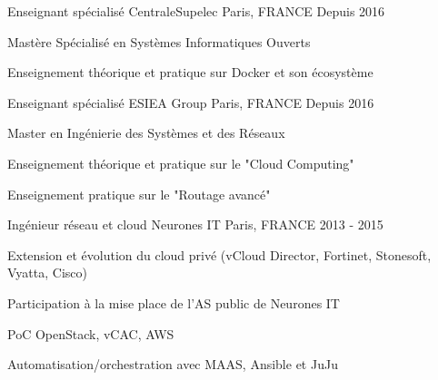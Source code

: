 \begin{cventries}
  \cventry
    {Enseignant spécialisé} %
    {CentraleSupelec}
    {Paris, FRANCE} %
    {Depuis 2016} %
    {
      \begin{cvitems} %
      \item {Mastère Spécialisé en Systèmes Informatiques Ouverts}
      \item {Enseignement théorique et pratique sur Docker et son écosystème}
      \end{cvitems}
    }

  \cventry
    {Enseignant spécialisé} %
    {ESIEA Group}
    {Paris, FRANCE} %
    {Depuis 2016} %
    {
      \begin{cvitems} %
      \item{Master en Ingénierie des Systèmes et des Réseaux} %
        \item {Enseignement théorique et pratique sur le "Cloud Computing"}
        \item {Enseignement pratique sur le "Routage avancé"}
      \end{cvitems}
    }

  \cventry
    {Ingénieur réseau et cloud}
    {Neurones IT} %
    {Paris, FRANCE} %
    {2013 - 2015} %
    {
      \begin{cvitems} %
      \item {Extension et évolution du cloud privé (vCloud Director, Fortinet, Stonesoft, Vyatta, Cisco)}
      \item {Participation à la mise place de l'AS public de Neurones IT}
        \item {PoC OpenStack, vCAC, AWS}
        \item {Automatisation/orchestration avec MAAS, Ansible et JuJu}
      \end{cvitems}
    }

\end{cventries}
